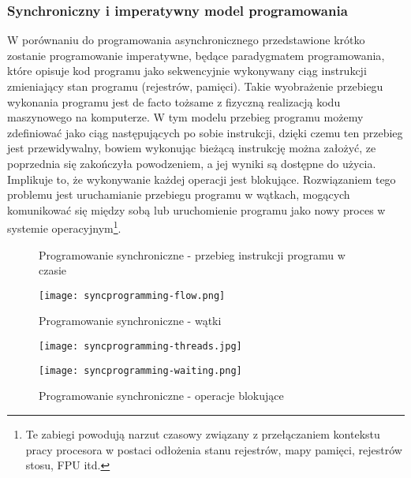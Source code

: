 \subsubsection{Synchroniczny i imperatywny model programowania}

W porównaniu do programowania asynchronicznego przedstawione krótko zostanie programowanie imperatywne, będące paradygmatem programowania\cite{programming-paradigms}, które opisuje kod programu jako sekwencyjnie wykonywany ciąg instrukcji zmieniający stan programu (rejestrów, pamięci). Takie wyobrażenie przebiegu wykonania programu jest de facto tożsame z fizyczną realizacją kodu maszynowego na komputerze. W tym modelu przebieg programu możemy zdefiniować jako ciąg następujących po sobie instrukcji, dzięki czemu ten przebieg jest przewidywalny, bowiem wykonując bieżącą instrukcję można założyć, ze poprzednia się zakończyła powodzeniem, a jej wyniki są dostępne do użycia. Implikuje to, że wykonywanie każdej operacji jest blokujące. Rozwiązaniem tego problemu jest uruchamianie przebiegu programu w wątkach, mogących komunikować się między sobą lub uruchomienie programu jako nowy proces w systemie operacyjnym\footnote{Te zabiegi powodują narzut czasowy związany z przełączaniem kontekstu pracy procesora w postaci odłożenia stanu rejestrów, mapy pamięci, rejestrów stosu, FPU itd.}.

\begin{figure}[ht]
\centering
\begin{minipage}[b]{0.45\linewidth}
  \label{fig:syncprogramming-flow}
  \caption[Programowanie synchroniczne - przebieg instrukcji programu w czasie]{Programowanie synchroniczne - przebieg instrukcji programu w czasie}
  \centering
    \texttt{[image: syncprogramming-flow.png]}
\end{minipage}

\begin{minipage}[b]{0.45\linewidth}
\label{fig:syncprogramming-threads}
  \caption[Programowanie synchroniczne - wątki]{Programowanie synchroniczne - wątki}
  \centering
    \texttt{[image: syncprogramming-threads.jpg]}
\end{minipage}

\begin{minipage}[b]{0.45\linewidth}
\label{fig:syncprogramming-waiting}
  \caption[Programowanie synchroniczne - operacje blokujące]{Programowanie synchroniczne - operacje blokujące}
  \centering
    \texttt{[image: syncprogramming-waiting.png]}
\end{minipage}
\end{figure}


